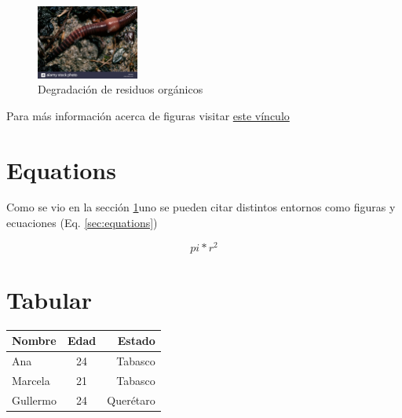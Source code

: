 \documentclass {article}
\begin{document}
\begin{figure}[h!]
	\centering
	\includegraphics[width=0.3\textwidth]{vectorial2}
	\caption{Degradaci\'on de residuos org\'anicos}
	\label{fig:alimentacion}
\end{figure}

Para m\'as informaci\'on acerca de figuras visitar  \href{https://en.wikibooks.org/wiki/LaTeX/Floats,_Figures_and_Captions}{este v\'inculo}

\section{Equations} %
\label{sec:equations}

Como se vio en la secci\'on \ref{sec:equations}uno se pueden citar distintos entornos como figuras y ecuaciones (Eq. \eqref{sec:equations})

\begin{equation}
pi*r{^2}
\end{equation}



\section{Tabular}
\label{sec:tabular}

\begin{tabular}{|l|c|r|}

\hline
\hline
\textbf{Nombre} & \textbf{Edad} & \textbf{Estado}\\
\hline
\hline
Ana     & 24 & Tabasco\\
Marcela & 21 & Tabasco\\
Gullermo& 24 & Querétaro\\

\end{tabular}
\end{document}
